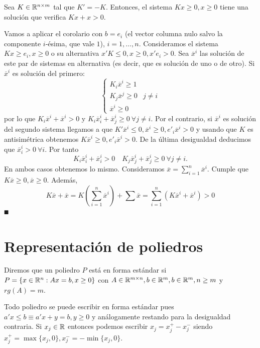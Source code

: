 \documentclass[PM.tex]{subfiles}
\begin{document}
\begin{lema}
Sea $K\in\mathbb{R}^{n\times m}$ tal que $K'=-K$. Entonces, el sistema $Kx\geq 0, x\geq 0$ tiene una solución que verifica $Kx+x>0$.
\end{lema}
\begin{dem}
Vamos a aplicar el corolario con $b=e_i$ (el vector columna nulo salvo la componente $i$-ésima, que vale $1$), $i=1,\dots, n$.
Consideramos el sistema $Kx\geq e_i, x\geq 0$ o su alternativa $x'K\leq 0, x\geq 0, x'e_i>0$. Sea $\overline{x}^i$ las solución de este par de sistemas en alternativa (es decir, que es solución de uno o de otro). Si $\overline{x}^i$ es solución del primero:
\[
\begin{cases}
K_i\overline{x}^i\geq 1 & \\
K_j\overline{x}^j\geq 0 & j\neq i\\
\overline{x}^i\geq 0 &
\end{cases}
\]
por lo que $K_i\overline{x}^i+\overline{x}^i>0$ y $ K_i\overline{x}^i_i + \overline{x}^i_j\geq 0\ \forall j\neq i$. Por el contrario, si $\overline{x}^i $ es solución del segundo sistema llegamos a que $K'\overline{x}^i\leq 0, \overline{x}^i\geq 0, e'_i\overline{x}^i>0$ y usando que $K$ es antisimétrica obtenemos $K\overline{x}^i\geq 0, e'_i\overline{x}^i>0$. De la última desigualdad deducimos que $\overline{x}^i_i> 0\ \forall i$. Por tanto
\[
K_i\overline{x}^i_i +\overline{x}^i_i>0\quad K_j\overline{x}^i_j +\overline{x}^i_j\geq 0\ \forall j\neq i.
\]
En ambos casos obtenemos lo mismo. Consideramos $\overline{x}=\sum_{i=1}^n\overline{x}^i$. Cumple que $K\overline{x}\geq 0, \overline{x}\geq 0$. Además, 
\[
K\overline{x}+\overline{x}=K(\sum_{i=1}^n\overline{x}^i)+\sum\overline{x}=\sum_{i=1}^n(K\overline{x}^i+\overline{x}^i)>0
\]
$\QED$
\end{dem}

\section{Representación de poliedros}

\begin{defi}
Diremos que un poliedro $P$ está en forma estándar si $P=\{x\in\mathbb{R}^n: Ax=b,x\geq 0\}$ con $A\in\mathbb{R}^{m\times n}, b\in\mathbb{R}^m, b\in\mathbb{R}^m, n\geq m$ y $rg(A)=m$.
\end{defi} 
\begin{nota}
Todo poliedro se puede escribir en forma estándar pues $a'x\leq b\equiv a'x+y=b, y\geq 0$ y análogamente restando para la desigualdad contraria.
Si $x_j\in\mathbb{R}$ entonces podemos escribir $x_j=x_j^+ -x_j^-$ siendo $x_j^+=\max{\{x_j,0\}}, x_j^-=-\min{\{x_j,0\}}$.
\end{nota}
\end{document}
